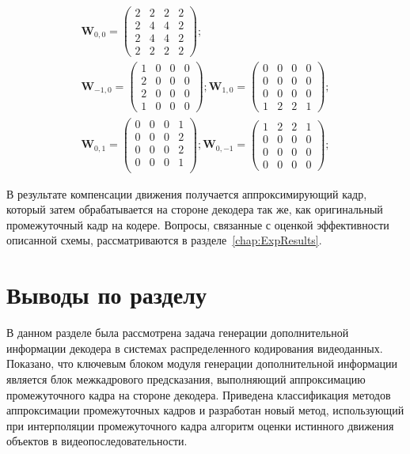 \begin{gather}
\mathbf{W}_{0,0} = 
\left(
\begin{matrix}
2 & 2 & 2 & 2 \\
2 & 4 & 4 & 2 \\
2 & 4 & 4 & 2 \\
2 & 2 & 2 & 2
\end{matrix}
\right);
\nonumber\\
\mathbf{W}_{-1,0} = 
\left(
\begin{matrix}
1 & 0 & 0 & 0 \\
2 & 0 & 0 & 0 \\
2 & 0 & 0 & 0 \\
1 & 0 & 0 & 0
\end{matrix}
\right);
\mathbf{W}_{1,0} = 
\left(
\begin{matrix}
0 & 0 & 0 & 0 \\
0 & 0 & 0 & 0 \\
0 & 0 & 0 & 0 \\
1 & 2 & 2 & 1
\end{matrix}
\right); 
\nonumber\\
\mathbf{W}_{0,1} = 
\left(
\begin{matrix}
0 & 0 & 0 & 1 \\
0 & 0 & 0 & 2 \\
0 & 0 & 0 & 2 \\
0 & 0 & 0 & 1 \\
\end{matrix}
\right);
\mathbf{W}_{0,-1} = 
\left(
\begin{matrix}
1 & 2 & 2 & 1 \\
0 & 0 & 0 & 0 \\
0 & 0 & 0 & 0 \\
0 & 0 & 0 & 0
\end{matrix}
\right); \nonumber
\end{gather}

В результате компенсации движения получается аппроксимирующий кадр, который затем обрабатывается на стороне декодера так же, как оригинальный промежуточный кадр на кодере. Вопросы, связанные с оценкой эффективности описанной схемы, рассматриваются в разделе~\ref{chap:ExpResults}.

\section{Выводы по разделу}

В данном разделе была рассмотрена задача генерации дополнительной информации декодера в системах распределенного кодирования видеоданных. Показано, что ключевым блоком модуля генерации дополнительной информации является блок межкадрового предсказания, выполняющий аппроксимацию промежуточного кадра на стороне декодера. Приведена классификация методов аппроксимации промежуточных кадров и разработан новый метод, использующий при интерполяции промежуточного кадра алгоритм оценки истинного движения объектов в видеопоследовательности.


